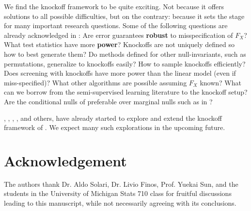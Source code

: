 \documentclass[article,lineno]{biometrika}
\begin{document}
	We find the knockoff framework to be quite exciting.
	Not because it offers solutions to all possible difficulties, but on the contrary: because it sets the stage for many important research questions.
	Some of the following questions are already acknowledged in \citet[Sec.7.2]{CandesPanninggoldmodelX2018}:
	Are error guarantees \textbf{robust} to misspecification of $F_X$?
	What test statistics have more \textbf{power}?
	Knockoffs are not uniquely defined so how to best generate them?
	Do methods defined for other null-invariants, such as permutations, generalize to knockoffs easily?
	How to sample knockoffs efficiently?
	Does screening with knockoffs have more power than the linear model (even if miss-specified)?
	What other algorithms are possible assuming $F_X$ known?
	What can we borrow from the semi-supervised learning literature to the knockoff setup?
	Are the conditional nulls of \cite{SesiaGenehuntinghidden} preferable over marginal nulls such as in \cite{TusherSignificanceanalysismicroarrays2001}?
	
	\cite{DaiknockofffilterFDR2016}, \cite{JansonFamilywiseerrorrate2016}, \cite{ChenAnalysisKnockoffFilter2017}, \cite{ChenPseudoKnockoffFilter2017}, and others, have already started to explore and extend the knockoff framework of \cite{BarberControllingfalsediscovery2015}.
	We expect many such explorations in the upcoming future.
	
	
	
	\section*{Acknowledgement}
	The authors thank  Dr. Aldo Solari, Dr. Livio Finos, Prof. Yuekai Sun, and the students in the University of Michigan Stats 710 class for fruitful discussions leading to this manuscript, while not necessarily agreeing with its conclusions.
	
	
	
	
	
	
	
\end{document}
